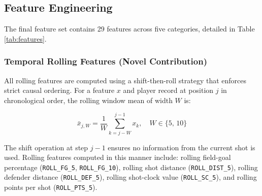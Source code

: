 \documentclass[conference]{IEEEtran}
\begin{document}
\subsection{Feature Engineering}

The final feature set contains 29 features across five categories,
detailed in Table\,\ref{tab:features}.

\begin{table}[H]
\centering
\caption{Feature Set (29 features across 5 categories)}
\label{tab:features}
\renewcommand{\arraystretch}{1.4}
\setlength{\tabcolsep}{2pt}
\scriptsize
{}
\vspace{0.1cm}
\end{table}

\subsubsection{Temporal Rolling Features (Novel Contribution)}
All rolling features are computed using a shift-then-roll strategy that
enforces strict causal ordering.  For a feature $x$ and player record at
position $j$ in chronological order, the rolling window mean of width
$W$ is:

\begin{equation}
\bar{x}_{j,W} = \frac{1}{W}\sum_{k=j-W}^{j-1} x_k, \quad W \in \{5,\,10\}
\end{equation}

The shift operation at step $j-1$ ensures no information from the
current shot is used.  Rolling features computed in this manner include:
rolling field-goal percentage (\texttt{ROLL\_FG\_5}, \texttt{ROLL\_FG\_10}),
rolling shot distance (\texttt{ROLL\_DIST\_5}), rolling defender distance
(\texttt{ROLL\_DEF\_5}), rolling shot-clock value (\texttt{ROLL\_SC\_5}),
and rolling points per shot (\texttt{ROLL\_PTS\_5}).
\end{document}
